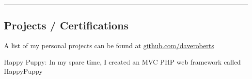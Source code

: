 \documentclass[10pt,letterpaper]{article}
\newenvironment{indentsection}[1]%
{\begin{list}{}%
	{\setlength{\leftmargin}{#1}}%
	\item[]%
}
{\end{list}}
\begin{document}
\hrule
\vspace{-0.4em}
\subsection*{Projects / Certifications}

\begin{indentsection}{\parindent}
A list of my personal projects can be found at \href{http://github.com/daveroberts}{github.com/daveroberts}
\begin{description*}
	\item[Happy Puppy:]
	In my spare time, I created an {\color{blue} MVC PHP} web framework called HappyPuppy
\end{description*}
\end{indentsection}
\end{document}
